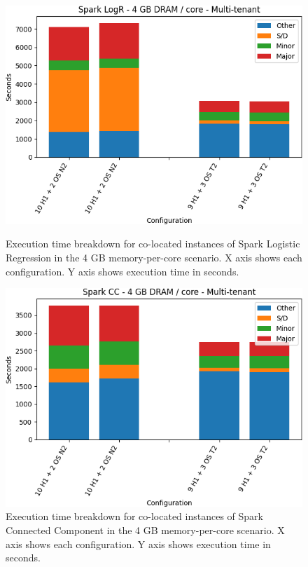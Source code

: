 \begin{figure}[thbp]
        \centering
    \includegraphics[width=\linewidth]{./fig/logr32.png}
    \caption{Execution time breakdown for co-located instances of Spark
    Logistic Regression in the 4 GB memory-per-core scenario. X axis shows each configuration.
        Y axis shows execution time in seconds.}
    \label{fig:logr32}

    \includegraphics[width=\linewidth]{./fig/cc32.png}
    \caption{Execution time breakdown for co-located instances of Spark
    Connected Component in the 4 GB memory-per-core scenario. X axis shows each configuration.
        Y axis shows execution time in seconds.}
    \label{fig:cc32}
\end{figure}

